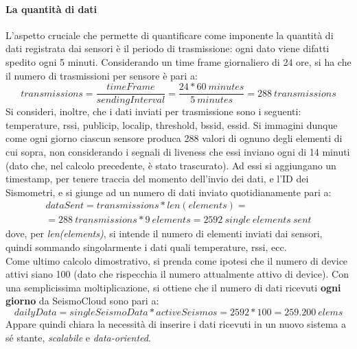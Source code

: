\paragraph{La quantità di dati}
L'aspetto cruciale che permette di quantificare come imponente la quantità di dati registrata dai sensori è il periodo di trasmissione: ogni dato viene difatti spedito ogni 5 minuti. Considerando un time frame giornaliero di 24 ore, si ha che il numero di trasmissioni per sensore è pari a:
\begin{equation} \label{eq:dailytrans}
transmissions = \frac{timeFrame}{sendingInterval} 
= \frac{24 * 60\ minutes}{5\ minutes} 
= 288\ transmissions
\end{equation}
Si consideri, inoltre, che i dati inviati per trasmissione sono i seguenti:\\
temperature, rssi, publicip, localip, threshold, bssid, essid.
Si immagini dunque come ogni giorno ciascun sensore produca 288 valori di ognuno degli elementi di cui sopra, non considerando i segnali di liveness che essi inviano ogni di 14 minuti (dato che, nel calcolo precedente, è stato trascurato). Ad essi si aggiungano un timestamp, per tenere traccia del momento dell'invio dei dati, e l'ID dei Sismometri, e si giunge ad un numero di dati inviato quotidianamente pari a:
\begin{equation} \label{eq:dailyoneseismo}
\begin{split}
dataSent = transmissions * len(elements) = \\
= 288\ transmissions * 9\ elements = 2592\ single\ elements\ sent
\end{split}
\end{equation}
dove, per \textit{len(elements)}, si intende il numero di elementi inviati dai sensori, quindi sommando singolarmente i dati quali temperature, rssi, ecc.\\
Come ultimo calcolo dimostrativo, si prenda come ipotesi che il numero di device attivi siano 100 (dato che rispecchia il numero attualmente attivo di device). Con una semplicissima moltiplicazione, si ottiene che il numero di dati ricevuti \textbf{ogni giorno} da SeismoCloud sono pari a:
\begin{equation} \label{eq:overalldailytrans}
dailyData = singleSeismoData * activeSeismos = 2592 * 100 = 259.200\ elems
\end{equation}
Appare quindi chiara la necessità di inserire i dati ricevuti in un nuovo sistema a sé stante, \textit{scalabile} e \textit{data-oriented}.

